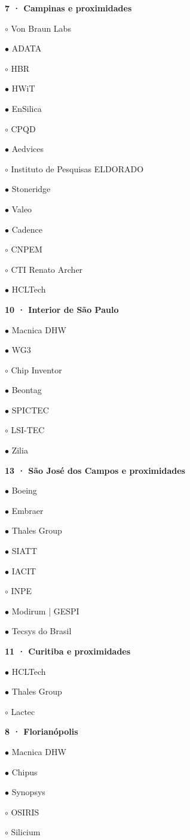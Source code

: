 \documentclass[10pt,a3paper]{article}
\begin{document}
\begin{minipage}[t]{.28\linewidth}\vspace{0pt}\small\raggedright
\textcolor{azul}{\textbf{7 · Campinas e proximidades}}\par
$\circ$ Von Braun Labs\par
$\bullet$ ADATA\par
$\circ$ HBR\par
$\bullet$ HWiT\par
$\bullet$ EnSilica\par
$\circ$ CPQD\par
$\bullet$ Aedvices\par
$\circ$ Instituto de Pesquisas ELDORADO\par
$\bullet$ Stoneridge\par
$\bullet$ Valeo\par
$\bullet$ Cadence\par
$\circ$ CNPEM\par
$\circ$ CTI Renato Archer\par
$\bullet$ HCLTech\par
\vspace{2mm}
\textcolor{azul}{\textbf{10 · Interior de São Paulo}}\par
$\bullet$ Macnica DHW\par
$\bullet$ WG3\par
$\circ$ Chip Inventor\par
$\bullet$ Beontag\par
$\bullet$ SPICTEC\par
$\circ$ LSI-TEC\par
$\bullet$ Zilia\par
\vspace{2mm}
\textcolor{azul}{\textbf{13 · São José dos Campos e proximidades}}\par
$\bullet$ Boeing\par
$\bullet$ Embraer\par
$\bullet$ Thales Group\par
$\bullet$ SIATT\par
$\bullet$ IACIT\par
$\circ$ INPE\par
$\bullet$ Modirum | GESPI\par
$\bullet$ Tecsys do Brasil\par
\vspace{2mm}
\textcolor{azul}{\textbf{11 · Curitiba e proximidades}}\par
$\bullet$ HCLTech\par
$\bullet$ Thales Group\par
$\circ$ Lactec\par
\vspace{2mm}
\textcolor{azul}{\textbf{8 · Florianópolis}}\par
$\bullet$ Macnica DHW\par
$\bullet$ Chipus\par
$\bullet$ Synopsys\par
$\circ$ OSIRIS\par
$\circ$ Silicium\par
\vspace{2mm}
\end{minipage}
\end{document}
